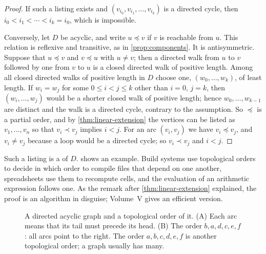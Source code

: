 \begin{proof}
If such a listing exists and $(v_{i_0},v_{i_1},\ldots,v_{i_k})$ is a directed cycle, then $i_0<i_1<\cdots<i_k=i_0$, which is impossible.

Conversely, let $D$ be acyclic, and write $u\preceq v$ if $v$ is reachable from $u$. This relation is reflexive and transitive, as in \cref{prop:components}. It is antisymmetric. Suppose that $u\preceq v$ and $v\preceq u$ with $u\ne v$; then a directed walk from $u$ to $v$ followed by one from $v$ to $u$ is a closed directed walk of positive length. Among all closed directed walks of positive length in $D$ choose one, $(w_0,\ldots,w_k)$, of least length. If $w_i=w_j$ for some $0\le i<j\le k$ other than $i=0$, $j=k$, then $(w_i,\ldots,w_j)$ would be a shorter closed walk of positive length; hence $w_0,\ldots,w_{k-1}$ are distinct and the walk is a directed cycle, contrary to the assumption. So $\preceq$ is a partial order, and by \cref{thm:linear-extension} the vertices can be listed as $v_1,\ldots,v_n$ so that $v_i\prec v_j$ implies $i<j$. For an arc $(v_i,v_j)$ we have $v_i\preceq v_j$, and $v_i\ne v_j$ because a loop would be a directed cycle; so $v_i\prec v_j$ and $i<j$.
\end{proof}

Such a listing is a  of $D$.  shows an example. Build systems use topological orders to decide in which order to compile files that depend on one another, spreadsheets use them to recompute cells, and the evaluation of an arithmetic expression follows one. As the remark after \cref{thm:linear-extension} explained, the proof is an algorithm in disguise; Volume~V gives an efficient version.

\begin{figure}
\hfill
{}
\caption{A directed acyclic graph and a topological order of it. (A) Each arc means that its tail must precede its head. (B) The order $b,a,d,c,e,f$: all arcs point to the right. The order $a,b,c,d,e,f$ is another topological order; a graph usually has many.}
\label{fig:dag}
\end{figure}

